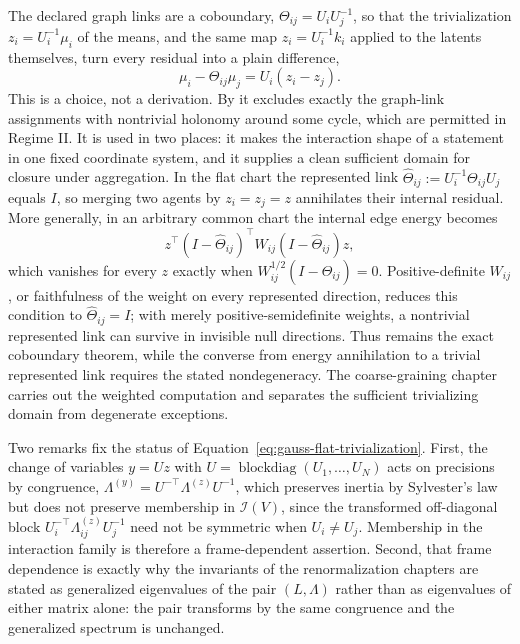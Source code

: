 The declared graph links are a coboundary, $\Theta_{ij}=U_iU_j^{-1}$, so that the trivialization $z_i=U_i^{-1}\mu_i$ of the means, and the same map $z_i=U_i^{-1}k_i$ applied to the latents themselves, turn every residual into a plain difference,
\begin{equation}
\mu_i-\Theta_{ij}\mu_j=U_i\left(z_i-z_j\right).
\label{eq:gauss-flat-trivialization}
\end{equation}
This is a choice, not a derivation. By  it excludes exactly the graph-link assignments with nontrivial holonomy around some cycle, which are permitted in Regime II. It is used in two places: it makes the interaction shape of  a statement in one fixed coordinate system, and it supplies a clean sufficient domain for closure under aggregation. In the flat chart the represented link
\(\widehat\Theta_{ij}:=U_i^{-1}\Theta_{ij}U_j\) equals \(I\), so merging two
agents by \(z_i=z_j=z\) annihilates their internal residual. More generally,
in an arbitrary common chart the internal edge energy becomes
\[
z^\top(I-\widehat\Theta_{ij})^\top
W_{ij}(I-\widehat\Theta_{ij})z,
\]
which vanishes for every \(z\) exactly when
\(W_{ij}^{1/2}(I-\widehat\Theta_{ij})=0\). Positive-definite \(W_{ij}\), or
faithfulness of the weight on every represented direction, reduces this
condition to \(\widehat\Theta_{ij}=I\); with merely positive-semidefinite
weights, a nontrivial represented link can survive in invisible null
directions. Thus  remains the exact
coboundary theorem, while the converse from energy annihilation to a trivial
represented link requires the stated nondegeneracy. The coarse-graining
chapter carries out the weighted computation and separates the sufficient
trivializing domain from degenerate exceptions. 

Two remarks fix the status of Equation~\eqref{eq:gauss-flat-trivialization}. First, the change of variables $y=Uz$ with $U=\operatorname{blockdiag}(U_1,\dots,U_N)$ acts on precisions by congruence, $\Lambda^{(y)}=U^{-\top}\Lambda^{(z)}U^{-1}$, which preserves inertia by Sylvester's law \citep[Ch.~4]{HornJohnson2013} but does not preserve membership in $\mathcal I(V)$, since the transformed off-diagonal block $U_i^{-\top}\Lambda^{(z)}_{ij}U_j^{-1}$ need not be symmetric when $U_i\neq U_j$. Membership in the interaction family is therefore a frame-dependent assertion. Second, that frame dependence is exactly why the invariants of the renormalization chapters are stated as generalized eigenvalues of the pair $(L,\Lambda)$ rather than as eigenvalues of either matrix alone: the pair transforms by the same congruence and the generalized spectrum is unchanged. 


